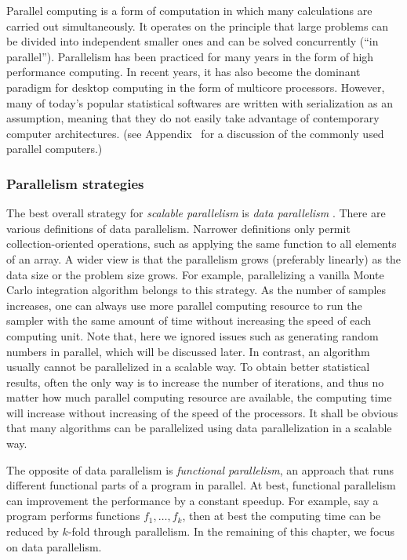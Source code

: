 Parallel computing is a form of computation in which many calculations are
carried out simultaneously. It operates on the principle that large problems
can be divided into independent smaller ones and can be solved concurrently
(``in parallel''). Parallelism has been practiced for many years in the form
of high performance computing. In recent years, it has also become the
dominant paradigm for desktop computing in the form of multicore processors.
However, many of today's popular statistical softwares are written with
serialization as an assumption, meaning that they do not easily take advantage
of contemporary computer architectures. (see Appendix~ for a discussion of the commonly used parallel
computers.)

\subsubsection{Parallelism strategies}
\label{ssub:Parallelism strategies}

The best overall strategy for \emph{scalable parallelism} is \emph{data
  parallelism} \cite{datapar}. There are various definitions of data
parallelism. Narrower definitions only permit collection-oriented operations,
such as applying the same function to all elements of an array. A wider view
is that the parallelism grows (preferably linearly) as the data size or the
problem size grows. For example, parallelizing a vanilla Monte Carlo
integration algorithm belongs to this strategy. As the number of samples
increases, one can always use more parallel computing resource to run the
sampler with the same amount of time without increasing the speed of each
computing unit. Note that, here we ignored issues such as generating random
numbers in parallel, which will be discussed later. In contrast, an \mcmc
algorithm usually cannot be parallelized in a scalable way. To obtain better
statistical results, often the only way is to increase the number of
iterations, and thus no matter how much parallel computing resource are
available, the computing time will increase without increasing of the speed of
the processors. It shall be obvious that many \smc algorithms can be
parallelized using data parallelization in a scalable way.

The opposite of data parallelism is \emph{functional parallelism}, an approach
that runs different functional parts of a program in parallel. At best,
functional parallelism can improvement the performance by a constant speedup.
For example, say a program performs functions $f_1,\dots,f_k$, then at best
the computing time can be reduced by $k$-fold through parallelism. In the
remaining of this chapter, we focus on data parallelism.

